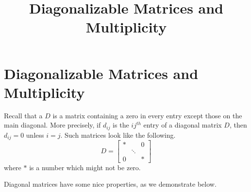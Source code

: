 \documentclass{ximera}
\title{Diagonalizable Matrices and Multiplicity} \license{CC BY-NC-SA 4.0}
\begin{document}
\begin{abstract}
\end{abstract}
\maketitle

\section*{Diagonalizable Matrices and Multiplicity}
Recall that a  $D$ is a matrix containing a zero in every entry except those on the main diagonal.  More precisely, if $d_{ij}$ is the $ij^{th}$ entry of a diagonal matrix $D$, then
$d_{ij}=0$ unless $i=j$. Such
matrices look like the following.
\begin{equation*}
D = 
\begin{bmatrix}
* &  & 0 \\
& \ddots &  \\
0 &  & *
\end{bmatrix}
\end{equation*}
where $*$ is a number which might not be zero.


Diagonal matrices have some nice properties, as we demonstrate below.
\end{document}
